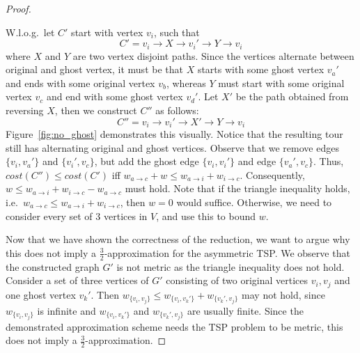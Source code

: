 \documentclass{article}
\begin{document}
\begin{proof}
\begin{itemize}
        W.l.o.g.~let $C'$ start with vertex $v_i$, such that
        \[
            C' = v_i \to X \to v_i' \to Y \to v_i
        \]
        where $X$ and $Y$ are two vertex disjoint paths. Since the vertices alternate between original and ghost vertex, it must be that $X$ starts with some ghost vertex $v_a'$ and ends with some original vertex $v_b$, whereas $Y$ must start with some original vertex $v_c$ and end with some ghost vertex $v_d'$. Let $X'$ be the path obtained from reversing $X$, then we construct $C''$ as follows:
         \[
            C'' = v_i \to v_i' \to X' \to Y \to v_i
        \]
        Figure~\ref{fig:no_ghost} demonstrates this visually. Notice that the resulting tour still has alternating original and ghost vertices. Observe that we remove edges $\{v_i, v_a'\}$ and $\{v_i', v_c\}$, but add the ghost edge $\{v_i, v_i'\}$ and edge $\{v_a', v_c\}$. Thus, $cost(C'') \le cost(C')$ iff $w_{a \to c} + w \le w_{a \to i} + w_{i \to c}$. Consequently, $w \le w_{a \to i} + w_{i \to c} - w_{a \to c}$ must hold. Note that if the triangle inequality holds, i.e.~$w_{a \to c} \le w_{a \to i} + w_{i \to c}$, then $w=0$ would suffice. Otherwise, we need to consider every set of 3 vertices in $V$, and use this to bound $w$.
    \end{itemize}
    Now that we have shown the correctness of the reduction, we want to argue why this does not imply a $\frac{3}{2}$-approximation for the asymmetric TSP. We observe that the constructed graph $G'$ is not metric as the triangle inequality does not hold. Consider a set of three vertices of $G'$ consisting of two original vertices $v_i, v_j$ and one ghost vertex $v_k'$. Then $w_{\{v_i, v_j\}} \le w_{\{v_i, v_k'\}} + w_{\{v_k', v_j\}}$ may not hold, since $w_{\{v_i, v_j\}}$ is infinite and $w_{\{v_i, v_k'\}}$ and $w_{\{v_k', v_j\}}$ are usually finite. Since the demonstrated approximation scheme needs the TSP problem to be metric, this does not imply a $\frac{3}{2}$-approximation.
\end{proof}
\end{document}
